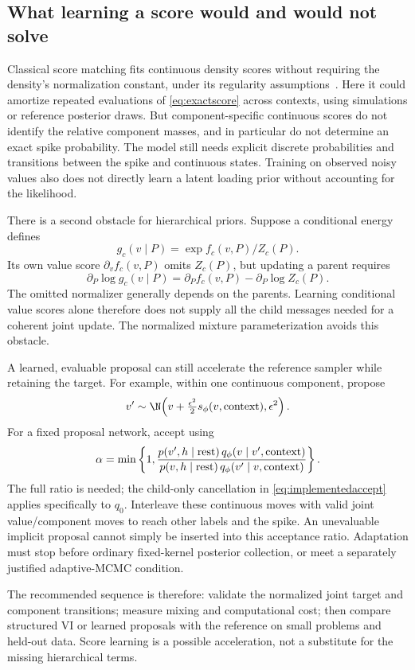 \subsection{What learning a score would and would not solve}
Classical score matching fits continuous density scores without requiring
the density's normalization constant, under its regularity
assumptions~\cite{hyvarinen}. Here it could amortize repeated evaluations
of \eqref{eq:exactscore} across contexts, using simulations or reference
posterior draws. But component-specific continuous scores do not identify
the relative component masses, and in particular do not determine an
exact spike probability. The model still needs explicit discrete
probabilities and transitions between the spike and continuous states.
Training on observed noisy values also does not directly learn a latent
loading prior without accounting for the likelihood.

There is a second obstacle for hierarchical priors. Suppose a conditional
energy defines
\[
g_c(v\mid P)=\exp f_c(v,P)/Z_c(P).
\]
Its own value score \(\partial_v f_c(v,P)\) omits \(Z_c(P)\), but updating
a parent requires
\[
\partial_P\log g_c(v\mid P)
=\partial_P f_c(v,P)-\partial_P\log Z_c(P).
\]
The omitted normalizer generally depends on the parents. Learning
conditional value scores alone therefore does not supply all the
child messages needed for a coherent joint update. The normalized
mixture parameterization avoids this obstacle.

A learned, evaluable proposal can still accelerate the reference
sampler while retaining the target. For example, within one continuous
component, propose
\[
v'\sim\N\!\left(v+\tfrac{\epsilon^2}2s_\phi(v,{\rm context}),
                  \epsilon^2\right).
\]
For a fixed proposal network, accept using
\begin{equation}
\alpha=\min\left\{1,
\frac{p(v',h\mid{\rm rest})\,q_\phi(v\mid v',{\rm context})}
     {p(v,h\mid{\rm rest})\,q_\phi(v'\mid v,{\rm context})}\right\}.
\end{equation}
The full ratio is needed; the child-only cancellation in
\eqref{eq:implementedaccept} applies specifically to \(q_0\).
Interleave these continuous moves with valid joint value/component moves
to reach other labels and the spike. An unevaluable implicit proposal
cannot simply be inserted into this acceptance ratio. Adaptation must
stop before ordinary fixed-kernel posterior collection, or meet a
separately justified adaptive-MCMC condition.

The recommended sequence is therefore: validate the normalized joint
target and component transitions; measure mixing and computational cost;
then compare structured VI or learned proposals with the reference on
small problems and held-out data. Score learning is a possible
acceleration, not a substitute for the missing hierarchical terms.
